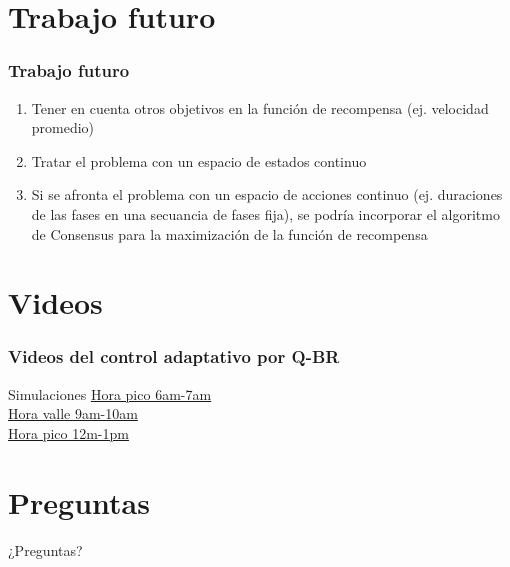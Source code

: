\documentclass[11pt]{beamer}
\begin{document}
\section{Trabajo futuro}
\begin{frame}
\frametitle{Trabajo futuro}
\begin{enumerate}
\item Tener en cuenta otros objetivos en la función de recompensa (ej. velocidad promedio)
\medskip
\item Tratar el problema con un espacio de estados continuo
\medskip
\item Si se afronta el problema con un espacio de acciones continuo (ej. duraciones de las fases en una secuancia de fases fija), se podría incorporar el algoritmo de Consensus para la maximización de la función de recompensa
\end{enumerate}
\end{frame}

\section{Videos}
\begin{frame}[fragile]
\frametitle{Videos del control adaptativo por Q-BR}
\begin{block}{Simulaciones}
\href{run:./videos/6a7.mp4}{Hora pico 6am-7am}\\
\href{run:./videos/9a10.mp4}{Hora valle 9am-10am}\\
\href{run:./videos/12a1.mp4}{Hora pico 12m-1pm}
\end{block}
\end{frame}


\section{Preguntas}
\begin{frame}
\begin{center}
\huge ¿Preguntas?
\end{center}
\end{frame}
\end{document}
